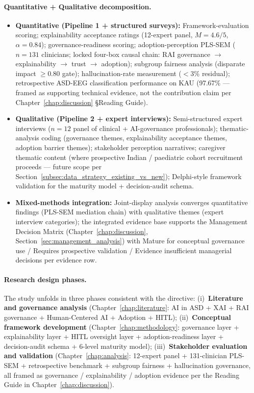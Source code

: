 \paragraph{Quantitative + Qualitative decomposition.}
\begin{itemize}[leftmargin=*, itemsep=3pt]
    \item \textbf{Quantitative (Pipeline 1 + structured surveys):} Framework-evaluation scoring; explainability acceptance ratings (12-expert panel, $M = 4.6/5$, $\alpha = 0.84$); governance-readiness scoring; adoption-perception PLS-SEM ($n = 131$ clinicians; locked four-box causal chain: RAI governance $\to$ explainability $\to$ trust $\to$ adoption); subgroup fairness analysis (disparate impact $\geq 0.80$ gate); hallucination-rate measurement ($< 3$\% residual); retrospective ASD-EEG classification performance on KAU (97.67\% --- framed as supporting technical evidence, not the contribution claim per Chapter~\ref{chap:discussion} §Reading Guide).
    \item \textbf{Qualitative (Pipeline 2 + expert interviews):} Semi-structured expert interviews ($n = 12$ panel of clinical + AI-governance professionals); thematic-analysis coding (governance themes, explainability acceptance themes, adoption barrier themes); stakeholder perception narratives; caregiver thematic content (where prospective Indian / paediatric cohort recruitment proceeds --- future scope per Section~\ref{subsec:data_strategy_existing_vs_new}); Delphi-style framework validation for the maturity model + decision-audit schema.
    \item \textbf{Mixed-methods integration:} Joint-display analysis converges quantitative findings (PLS-SEM mediation chain) with qualitative themes (expert interview categories); the integrated evidence base supports the Management Decision Matrix (Chapter~\ref{chap:discussion}, Section~\ref{sec:management_analysis}) with Mature for conceptual governance use / Requires prospective validation / Evidence insufficient managerial decisions per evidence row.
\end{itemize}

\paragraph{Research design phases.} The study unfolds in three phases consistent with the directive: (i)~\textbf{Literature and governance analysis} (Chapter~\ref{chap:literature}: AI in ASD + XAI + RAI governance + Human-Centered AI + Adoption + HITL); (ii)~\textbf{Conceptual framework development} (Chapter~\ref{chap:methodology}: governance layer + explainability layer + HITL oversight layer + adoption-readiness layer + decision-audit schema + 6-level maturity model); (iii)~\textbf{Stakeholder evaluation and validation} (Chapter~\ref{chap:analysis}: 12-expert panel + 131-clinician PLS-SEM + retrospective benchmark + subgroup fairness + hallucination governance, all framed as governance / explainability / adoption evidence per the Reading Guide in Chapter~\ref{chap:discussion}).


